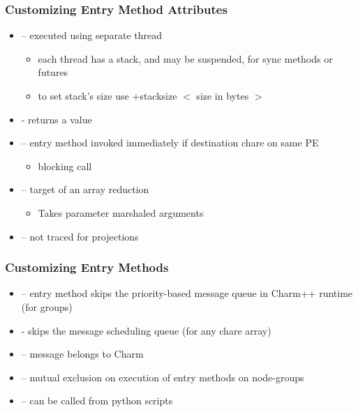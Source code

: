 \begin{frame}[fragile]
  \frametitle{Customizing Entry Method Attributes}
  \begin{itemize}
    \item {} – executed using separate thread
    \begin{itemize}
      \item each thread has a stack, and may be suspended, for sync methods or futures
      \item to set stack’s size use +stacksize $<$ size in bytes $>$
    \end{itemize}
    \item {} - returns a value
    \item {} – entry method invoked immediately if destination chare on same PE
    \begin{itemize}
      \item blocking call
    \end{itemize}
    \item {} – target of an array reduction
    \begin{itemize}
      \item Takes parameter marshaled arguments
    \end{itemize}
    \item {} – not traced for projections
  \end{itemize}
\end{frame}

\begin{frame}[fragile]
  \frametitle{Customizing Entry Methods}
  \begin{itemize}
    \item {} – entry method skips the priority-based message queue in Charm++ runtime (for groups)
    \item {} - skips the message scheduling queue (for any chare array)
    \item {} – message belongs to Charm
    \item {} – mutual exclusion on execution of entry methods on node-groups 
    \item {} – can be called from python scripts
  \end{itemize}
\end{frame}

